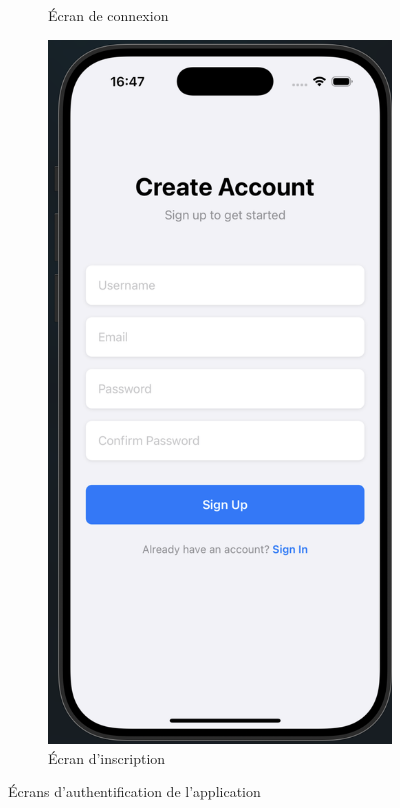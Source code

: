 \begin{figure}[H]
\begin{subfigure}[b]{0.48\textwidth}
        \caption{Écran de connexion}
        \label{fig:login}
    \end{subfigure}
    \hfill
    \begin{subfigure}[b]{0.48\textwidth}
        \includegraphics[width=\textwidth]{images/signup page.png}
        \caption{Écran d'inscription}
        \label{fig:register}
    \end{subfigure}
    \caption{Écrans d'authentification de l'application}
    \label{fig:auth-screens}
\end{figure}

